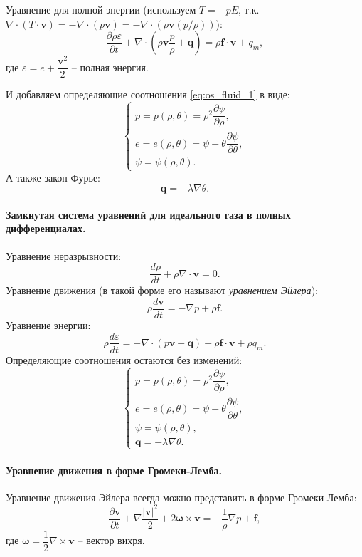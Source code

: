 Уравнение для полной энергии (используем $T = -p E$, т.к. $\nabla \cdot (T \cdot\mathbf{v}) = - \nabla \cdot (p \mathbf{v}) = - \nabla \cdot (\rho \mathbf{v} (p / \rho)) $):
\[
  \dfrac{\partial \rho \varepsilon}{\partial t} + \nabla \cdot \left( \rho \mathbf{v} \dfrac{p}{\rho} + \mathbf{q} \right) = \rho \mathbf{f} \cdot \mathbf{v} + q_m,
\]
где $\varepsilon = e + \dfrac{\mathbf{v}^2}{2}$ -- полная энергия.

И добавляем определяющие соотношения \eqref{eq:os_fluid_1} в виде:
\[
  \begin{cases}
    p = p(\rho, \theta) = \rho^2 \dfrac{\partial \psi}{\partial \rho}, \\
    e = e(\rho, \theta) = \psi - \theta \dfrac{\partial \psi}{\partial \theta}, \\
    \psi = \psi(\rho, \theta).
  \end{cases}
\]
А также закон Фурье:
\[
  \mathbf{q} = - \lambda \nabla \theta.
\]

\paragraph{Замкнутая система уравнений для идеального газа в полных дифференциалах.}

Уравнение неразрывности:
\[
  \dfrac{d \rho}{dt} + \rho \nabla \cdot \mathbf{v} = 0.
\]
Уравнение движения (в такой форме его называют \emph{уравнением Эйлера}):
\[
  \rho \dfrac{d \mathbf{v}}{dt} = - \nabla p + \rho \mathbf{f}.
\]
Уравнение энергии:
\[
  \rho \dfrac{d\varepsilon}{dt} = - \nabla \cdot \left( p \mathbf{v} + \mathbf{q} \right) + \rho \mathbf{f} \cdot \mathbf{v} + \rho q_m.
\]
Определяющие соотношения остаются без изменений:
\[
  \begin{cases}
    p = p(\rho, \theta) = \rho^2 \dfrac{\partial \psi}{\partial \rho}, \\
    e = e(\rho, \theta) = \psi - \theta \dfrac{\partial \psi}{\partial \theta}, \\
    \psi = \psi(\rho, \theta), \\
    \mathbf{q} = - \lambda \nabla \theta.
  \end{cases}    
\]

\paragraph{Уравнение движения в форме Громеки-Лемба.}

\begin{theorem}
  Уравнение движения Эйлера всегда можно представить в форме Громеки-Лемба:
  \[
    \dfrac{\partial \mathbf{v}}{\partial t} + \nabla \dfrac{|\mathbf{v}|^2}{2} + 2 \mathbf{\omega} \times \mathbf{v} = - \dfrac{1}{\rho} \nabla p + \mathbf{f},
  \]
  где $\mathbf{\omega} = \dfrac{1}{2} \nabla \times \mathbf{v}$ -- вектор вихря.
\end{theorem}

